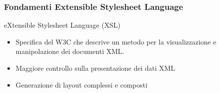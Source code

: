     

    



\begin{frame}
    \frametitle{Fondamenti Extensible Stylesheet Language}
    \addtocounter{nframe}{1}
    

     \begin{block}{eXtensible Stylesheet Language (XSL)}
         \begin{itemize}
            \item  Specifica del W3C che descrive un metodo per la visualizzazione e manipolazione dei documenti XML.
             \item Maggiore controllo sulla presentazione dei dati XML
             \item Generazione di layout complessi e composti
        \end{itemize}
     \end{block}
    
\end{frame}


